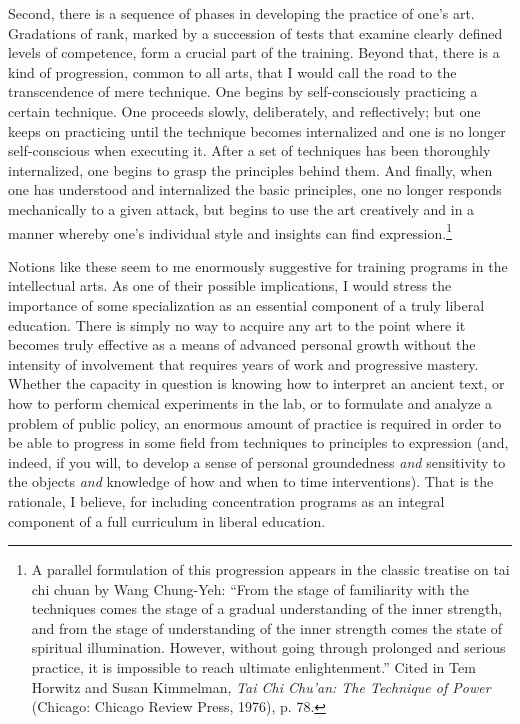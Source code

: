 Second, there is a sequence of phases in developing the practice of one's art. Gradations of rank, marked by a succession of tests that examine clearly defined levels of competence, form a crucial part of the training. Beyond that, there is a kind of progression, common to all arts, that I would call the road to the transcendence of mere technique. One begins by self-consciously practicing a certain technique. One proceeds slowly, deliberately, and reflectively; but one keeps on practicing until the technique becomes internalized and one is no longer self-conscious when executing it. After a set of techniques has been thoroughly internalized, one begins to grasp the principles behind them. And finally, when one has understood and internalized the basic principles, one no longer responds mechanically to a given attack, but begins to use the art creatively and in a manner whereby one's individual style and insights can find expression.\footnote{A parallel formulation of this progression appears in the classic treatise on tai chi chuan by Wang Chung-Yeh: ``From the stage of familiarity with the techniques comes the stage of a gradual understanding of the inner strength, and from the stage of understanding of the inner strength comes the state of spiritual illumination. However, without going through prolonged and serious practice, it is impossible to reach ultimate enlightenment.'' Cited in Tem Horwitz and Susan Kimmelman, \emph{Tai Chi Chu'an: The Technique of Power} (Chicago: Chicago Review Press, 1976), p. 78. }

Notions like these seem to me enormously suggestive for training programs in the intellectual arts. As one of their possible implications, I would stress the importance of some specialization as an essential component of a truly liberal education. There is simply no way to acquire any art to the point where it becomes truly effective as a means of advanced personal growth without the intensity of involvement that requires years of work and progressive mastery. Whether the capacity in question is knowing how to interpret an ancient text, or how to perform chemical experiments in the lab, or to formulate and analyze a problem of public policy, an enormous amount of practice is required in order to be able to progress in some field from techniques to principles to expression (and, indeed, if you will, to develop a sense of personal groundedness \emph{and} sensitivity to the objects \emph{and} knowledge of how and when to time interventions). That is the rationale, I believe, for including concentration programs as an integral component of a full curriculum in liberal education. 

